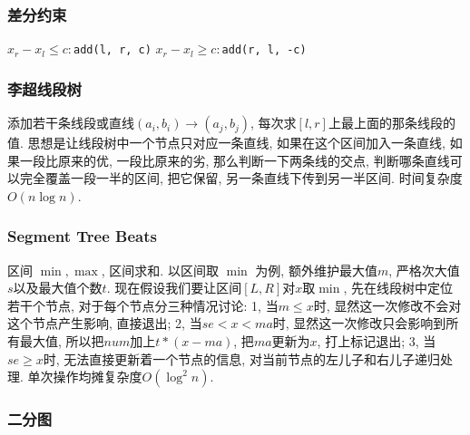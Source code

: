 \subsubsection{差分约束}
$x_r - x_l \leq c:$\texttt{add(l, r, c)}
$x_r - x_l \geq c:$\texttt{add(r, l, -c)}
\begin{comment}
\subsubsection{斯坦纳树}\
		在一个无向带权图$G=(V,E)$中, 将指定的$k$个点连通的一颗树称为\textbf{斯坦纳树}, 边权总和最小的斯坦纳树称为最小斯坦纳树. 
		\par 我们可以用DP+SPFA的方法求解斯坦纳树. 用$F_{i,state}$表示以$i$为根, 指定集合中的点的联通状态为$state$的生成树的最小总权值, 有两种转移方程. 
		\par 第一种, 通过两个子集合并进行转移, 即$F_{i,state}=min(F_{i,subset1} + F_{i,subset2})$, 这一部分使用DP完成. 
		\par 第二种, 在当前的联通状态下, 对该联通状态进行松弛操作, 即${F_{i,state}=min(F_{i,state},F_{j,state}+w(i,j))}$, 这一部分使用SPFA完成. 
        \par 时间复杂度$O(V*3^k+cE*2^k)$, $c$为SPFA复杂度中的常数. 
\end{comment}
\subsubsection{李超线段树}
        添加若干条线段或直线$(a_i,b_i)\to (a_j,b_j)$, 每次求$[l,r]$上最上面的那条线段的值. 思想是让线段树中一个节点只对应一条直线, 如果在这个区间加入一条直线, 如果一段比原来的优, 一段比原来的劣, 那么判断一下两条线的交点, 判断哪条直线可以完全覆盖一段一半的区间, 把它保留, 另一条直线下传到另一半区间. 时间复杂度$O(n \log n)$. 
\subsubsection{Segment Tree Beats}
        区间 $\min, \max$, 区间求和. 以区间取 $\min$ 为例, 额外维护最大值$m$, 严格次大值$s$以及最大值个数$t$. 现在假设我们要让区间$[L,R]$对$x$取$\min$, 先在线段树中定位若干个节点, 对于每个节点分三种情况讨论: 1, 当$m\leq x$时, 显然这一次修改不会对这个节点产生影响, 直接退出; 2, 当$se<x<ma$时, 显然这一次修改只会影响到所有最大值, 所以把$num$加上$t*(x-ma)$, 把$ma$更新为$x$, 打上标记退出; 3, 当$se\geq x$时, 无法直接更新着一个节点的信息, 对当前节点的左儿子和右儿子递归处理. 单次操作均摊复杂度$O(\log^2n)$. 

\subsubsection{二分图}
